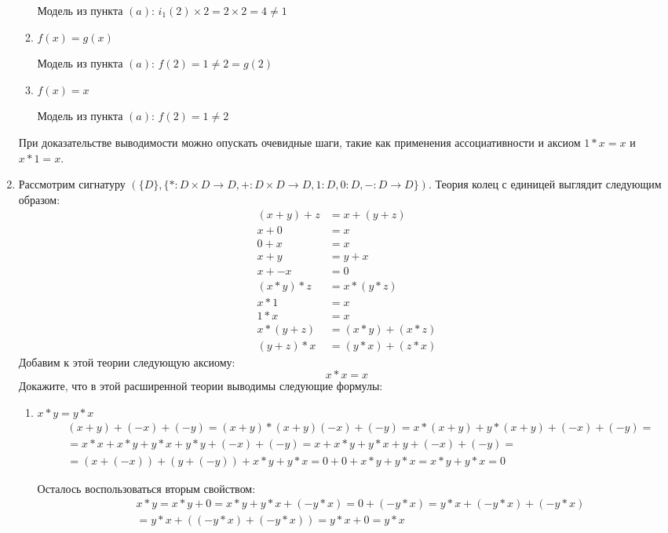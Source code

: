 \begin{enumerate}
\begin{enumerate}
Модель из пункта $(a)$: $i_1(2) \times 2 = 2 \times 2 = 4 \neq 1$

\item $f(x) = g(x)$

Модель из пункта $(a)$: $f(2) = 1 \neq 2 = g(2)$

\item $f(x) = x$

Модель из пункта $(a)$: $f(2) = 1 \neq 2$

\end{enumerate}
При доказательстве выводимости можно опускать очевидные шаги, такие как применения ассоциативности и аксиом $1 * 
x = x$ и $x * 1 = x$.

\item Рассмотрим сигнатуру $(\{D\}, \{ * : D \times D \to D, + : D \times D \to D, 1 : D, 0 : D, - : D \to D \})$.
    Теория колец с единицей выглядит следующим образом:
\begin{align*}
(x + y) + z & = x + (y + z) \\
x + 0 & = x \\
0 + x & = x \\
x + y & = y + x \\
x + -x & = 0 \\
(x * y) * z & = x * (y * z) \\
x * 1 & = x \\
1 * x & = x \\
x * (y + z) & = (x * y) + (x * z) \\
(y + z) * x & = (y * x) + (z * x)
\end{align*}
Добавим к этой теории следующую аксиому:
\[ x * x = x \]
Докажите, что в этой расширенной теории выводимы следующие формулы:
\begin{enumerate}
\item $x * y = y * x$
\begin{align*}
&(x + y) + (-x) + (-y) = (x + y)*(x + y) (-x) + (-y) = x*(x + y) + y*(x + y) + (-x) + (-y) = \\
&=x * x + x * y + y * x + y * y + (-x) + (-y) = x + x * y + y * x + y + (-x) + (-y) = \\
&=(x + (-x)) + (y + (-y)) + x * y + y * x = 0 + 0 + x * y + y * x = x * y + y * x = 0
\end{align*}

Осталось воспользоваться вторым свойством:
\begin{align*}
&x * y = x * y + 0 = x * y + y * x + (-y * x) = 0 + (-y * x) = y * x + (-y * x) + (-y * x) \\
&= y * x + ((-y * x) + (-y * x)) = y * x + 0 = y * x
\end{align*}


\end{enumerate}
\end{enumerate}
